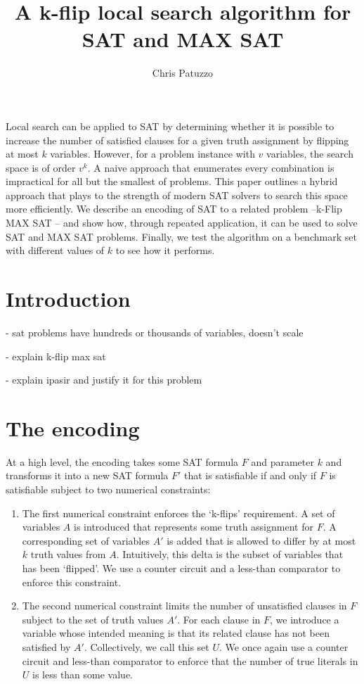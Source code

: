 \documentclass{article}
\begin{document}
\title{A k-flip local search algorithm for SAT and MAX SAT}
\author{Chris Patuzzo}
\maketitle

\abstract
Local search can be applied to SAT by determining whether it is possible to
increase the number of satisfied clauses for a given truth assignment by
flipping at most $k$ variables. However, for a problem instance with $v$
variables, the search space is of order $v^k$. A naive approach that enumerates
every combination is impractical for all but the smallest of problems. This
paper outlines a hybrid approach that plays to the strength of modern SAT
solvers to search this space more efficiently. We describe an encoding of SAT
to a related problem –\linebreak k-Flip MAX SAT – and show how, through repeated
application, it can be used to solve SAT and MAX SAT problems. Finally, we test
the algorithm on a benchmark set with different values of $k$ to see how it
performs.

\section{Introduction}
- sat problems have hundreds or thousands of variables, doesn't scale

- explain k-flip max sat

- explain ipasir and justify it for this problem

\section{The encoding}

At a high level, the encoding takes some SAT formula $F$ and parameter $k$ and
transforms it into a new SAT formula $F'$ that is satisfiable if and only if
$F$ is satisfiable subject to two numerical constraints:

\begin{enumerate}
  \item The first numerical constraint enforces the ‘k-flips’ requirement. A
    set of variables $A$ is introduced that represents some truth assignment
    for $F$. A corresponding set of variables $A'$ is added that is allowed to
    differ by at most $k$ truth values from $A$. Intuitively, this delta is the
    subset of variables that has been ‘flipped’. We use a counter circuit and a
    less-than comparator to enforce this constraint.

  \item The second numerical constraint limits the number of unsatisfied
    clauses in $F$ subject to the set of truth values $A'$. For each clause in
    $F$, we introduce a variable whose intended meaning is that its related
    clause has not been satisfied by $A'$. Collectively, we call this set $U$.
    We once again use a counter circuit and less-than comparator to enforce
    that the number of true literals in $U$ is less than some value.
\end{enumerate}
\end{document}
